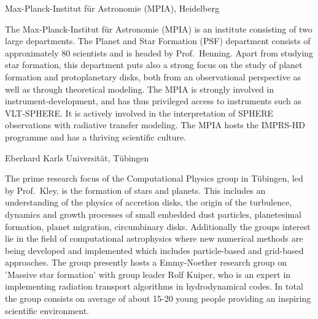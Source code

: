 \documentclass[10pt,fleqn,twoside]{article}
\begin{document}
\begin{Emphasize}
Max-Planck-Institut f\"ur Astronomie (MPIA), Heidelberg\\
\end{Emphasize}
The Max-Planck-Institut f\"ur Astronomie (MPIA) is an institute consisting
of two large departments. The Planet and Star Formation (PSF) department
consists of approximately 80 scientists and is headed by Prof.~Henning.
Apart from studying star formation, this department puts also a strong focus
on the study of planet formation and protoplanetary disks, both from an
observational perspective as well as through theoretical modeling.  The MPIA
is strongly involved in instrument-development, and has thus privileged
access to instruments such as VLT-SPHERE. It is actively involved in the
interpretation of SPHERE observations with radiative transfer modeling. The
MPIA hosts the IMPRS-HD programme and has a thriving scientific culture.
\vspace{1em}

\begin{Emphasize}
Eberhard Karls Universit\"at, T\"ubingen\\
\end{Emphasize}
The prime research focus of the Computational Physics group in T\"ubingen,
led by Prof.~Kley, is the
formation of stars and planets. This includes an understanding
of the physics of accretion disks, the origin of the turbulence, dynamics
and growth processes of small embedded dust particles, planetesimal formation,
planet migration, circumbinary disks. Additionally the groups interest lie in the
field of computational astrophysics where new numerical methods are being developed and
implemented which includes particle-based and grid-based approaches.
The group presently hosts a Emmy-Noether research group on 'Massive star formation'
with group leader Rolf Kuiper, who is an expert in implementing
radiation transport algorithms in hydrodynamical codes. In total the
group consists on average of about 15-20 young people providing an
inspiring scientific environment. 
\vspace{1em}
\end{document}
